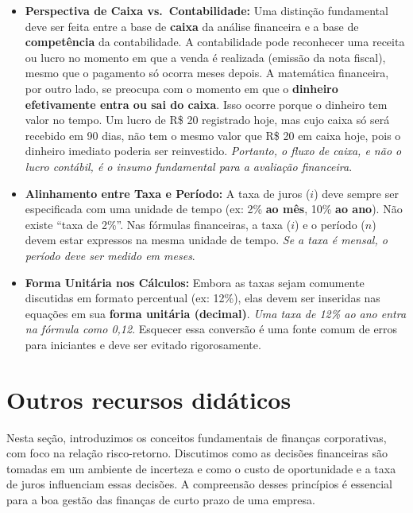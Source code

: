 \documentclass[
  a4paper,
]{book}
\begin{document}
\begin{tcolorbox}
\begin{itemize}
\item
  \textbf{Perspectiva de Caixa vs.~Contabilidade:} Uma distinção
  fundamental deve ser feita entre a base de \textbf{caixa} da análise
  financeira e a base de \textbf{competência} da contabilidade. A
  contabilidade pode reconhecer uma receita ou lucro no momento em que a
  venda é realizada (emissão da nota fiscal), mesmo que o pagamento só
  ocorra meses depois. A matemática financeira, por outro lado, se
  preocupa com o momento em que o \textbf{dinheiro efetivamente entra ou
  sai do caixa}. Isso ocorre porque o dinheiro tem valor no tempo. Um
  lucro de R\$ 20 registrado hoje, mas cujo caixa só será recebido em 90
  dias, não tem o mesmo valor que R\$ 20 em caixa hoje, pois o dinheiro
  imediato poderia ser reinvestido. \emph{Portanto, o fluxo de caixa, e
  não o lucro contábil, é o insumo fundamental para a avaliação
  financeira}.
\item
  \textbf{Alinhamento entre Taxa e Período:} A taxa de juros (\(i\))
  deve sempre ser especificada com uma unidade de tempo (ex: 2\%
  \textbf{ao mês}, 10\% \textbf{ao ano}). Não existe ``taxa de 2\%''.
  Nas fórmulas financeiras, a taxa (\(i\)) e o período (\(n\)) devem
  estar expressos na mesma unidade de tempo. \emph{Se a taxa é mensal, o
  período deve ser medido em meses}.
\item
  \textbf{Forma Unitária nos Cálculos:} Embora as taxas sejam comumente
  discutidas em formato percentual (ex: 12\%), elas devem ser inseridas
  nas equações em sua \textbf{forma unitária (decimal)}. \emph{Uma taxa
  de 12\% ao ano entra na fórmula como 0,12}. Esquecer essa conversão é
  uma fonte comum de erros para iniciantes e deve ser evitado
  rigorosamente.
\end{itemize}

\end{tcolorbox}

\section*{Outros recursos didáticos}\label{outros-recursos-diduxe1ticos}


Nesta seção, introduzimos os conceitos fundamentais de finanças
corporativas, com foco na relação risco-retorno. Discutimos como as
decisões financeiras são tomadas em um ambiente de incerteza e como o
custo de oportunidade e a taxa de juros influenciam essas decisões. A
compreensão desses princípios é essencial para a boa gestão das finanças
de curto prazo de uma empresa.
\end{document}
